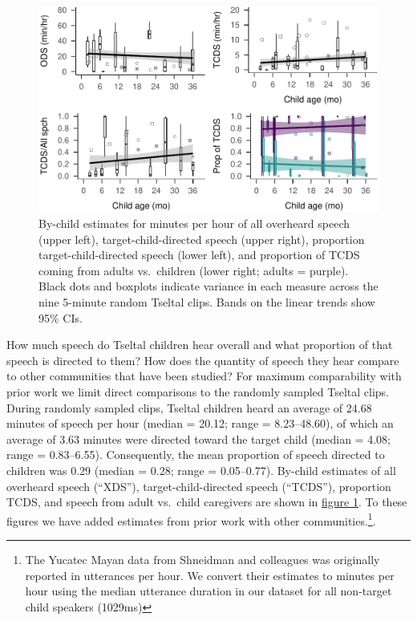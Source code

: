 \documentclass[floatsintext,man]{apa6}
\theoremstyle{definition}
\theoremstyle{definition}
\theoremstyle{definition}
\theoremstyle{remark}
\begin{document}
\begin{figure}
\centering
\includegraphics{Tseltal-CLE_files/figure-latex/fig1-1.pdf}
\caption{\label{fig:fig1}By-child estimates for minutes per hour of all
overheard speech (upper left), target-child-directed speech (upper
right), proportion target-child-directed speech (lower left), and
proportion of TCDS coming from adults vs.~children (lower right; adults
= purple). Black dots and boxplots indicate variance in each measure
across the nine 5-minute random Tseltal clips. Bands on the linear
trends show 95\% CIs.}
\end{figure}

How much speech do Tseltal children hear overall and what proportion of
that speech is directed to them? How does the quantity of speech they
hear compare to other communities that have been studied? For maximum
comparability with prior work we limit direct comparisons to the
randomly sampled Tseltal clips. During randomly sampled clips, Tseltal
children heard an average of 24.68 minutes of speech per hour (median =
20.12; range = 8.23--48.60), of which an average of 3.63 minutes were
directed toward the target child (median = 4.08; range = 0.83--6.55).
Consequently, the mean proportion of speech directed to children was
0.29 (median = 0.28; range = 0.05--0.77). By-child estimates of all
overheard speech (\enquote{XDS}), target-child-directed speech
(\enquote{TCDS}), proportion TCDS, and speech from adult vs.~child
caregivers are shown in \protect\hyperlink{fig1}{figure 1}. To these
figures we have added estimates from prior work with other
communities.\footnote{The Yucatec Mayan data from Shneidman and colleagues was originally reported in utterances per hour. We convert their estimates to minutes per hour using the median utterance duration in our dataset for all non-target child speakers (1029ms)}.
\end{document}
